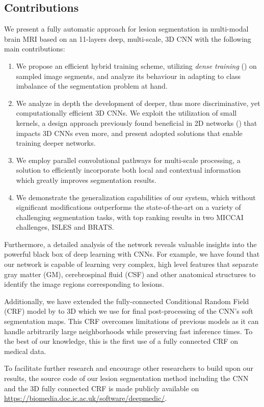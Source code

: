 \subsection{Contributions}

We present a fully automatic approach for lesion segmentation in multi-modal brain MRI based on an 11-layers deep, multi-scale, 3D CNN with the following main contributions:

\begin{enumerate}

\item We propose an efficient hybrid training scheme, utilizing \textit{dense training} (\cite{Long2014}) on sampled image segments, and analyze its behaviour in adapting to class imbalance of the segmentation problem at hand.

\item We analyze in depth the development of deeper, thus more discriminative, yet computationally efficient 3D CNNs. We exploit the utilization of small kernels, a design approach previously found beneficial in 2D networks (\cite{Simonyan2014}) that impacts 3D CNNs even more, and present adopted solutions that enable training deeper networks. 

\item We employ parallel convolutional pathways for multi-scale processing, a solution to efficiently incorporate both local and contextual information which greatly improves segmentation results.

\item We demonstrate the generalization capabilities of our system, which without significant modifications outperforms the state-of-the-art on a variety of challenging segmentation tasks, with top ranking results in two MICCAI challenges, ISLES and BRATS.

\end{enumerate}

Furthermore, a detailed analysis of the network reveals valuable insights into the powerful black box of deep learning with CNNs. For example, we have found that our network is capable of learning very complex, high level features that separate gray matter (GM), cerebrospinal fluid (CSF) and other anatomical structures to identify the image regions corresponding to lesions.

Additionally, we have extended the fully-connected Conditional Random Field (CRF) model by \cite{Krahenbuhl2013} to 3D which we use for final post-processing of the CNN's soft segmentation maps. This CRF overcomes limitations of previous models as it can handle arbitrarily large neighborhoods while preserving fast inference times. To the best of our knowledge, this is the first use of a fully connected CRF on medical data.

To facilitate further research and encourage other researchers to build upon our results, the source code of our lesion segmentation method including the CNN and the 3D fully connected CRF is made publicly available on \url{https://biomedia.doc.ic.ac.uk/software/deepmedic/}.

